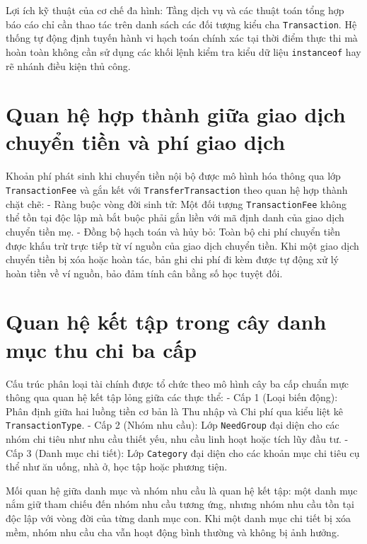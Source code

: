 \documentclass[a4paper,12pt]{report}
\newcommand{\passthrough}[1]{#1}
\begin{document}
Lợi ích kỹ thuật của cơ chế đa hình: Tầng dịch vụ và các thuật toán tổng
hợp báo cáo chỉ cần thao tác trên danh sách các đối tượng kiểu cha
\passthrough{\lstinline!Transaction!}. Hệ thống tự động định tuyến hành
vi hạch toán chính xác tại thời điểm thực thi mà hoàn toàn không cần sử
dụng các khối lệnh kiểm tra kiểu dữ liệu
\passthrough{\lstinline!instanceof!} hay rẽ nhánh điều kiện thủ công.

\section{Quan hệ hợp thành giữa giao dịch chuyển tiền và phí giao
dịch}\label{quan-hux1ec7-hux1ee3p-thuxe0nh-giux1eefa-giao-dux1ecbch-chuyux1ec3n-tiux1ec1n-vuxe0-phuxed-giao-dux1ecbch}

Khoản phí phát sinh khi chuyển tiền nội bộ được mô hình hóa thông qua
lớp \passthrough{\lstinline!TransactionFee!} và gắn kết với
\passthrough{\lstinline!TransferTransaction!} theo quan hệ hợp thành
chặt chẽ: - Ràng buộc vòng đời sinh tử: Một đối tượng
\passthrough{\lstinline!TransactionFee!} không thể tồn tại độc lập mà
bắt buộc phải gắn liền với mã định danh của giao dịch chuyển tiền mẹ. -
Đồng bộ hạch toán và hủy bỏ: Toàn bộ chi phí chuyển tiền được khấu trừ
trực tiếp từ ví nguồn của giao dịch chuyển tiền. Khi một giao dịch
chuyển tiền bị xóa hoặc hoàn tác, bản ghi chi phí đi kèm được tự động xử
lý hoàn tiền về ví nguồn, bảo đảm tính cân bằng số học tuyệt đối.

\section{Quan hệ kết tập trong cây danh mục thu chi ba
cấp}\label{quan-hux1ec7-kux1ebft-tux1eadp-trong-cuxe2y-danh-mux1ee5c-thu-chi-ba-cux1ea5p}

Cấu trúc phân loại tài chính được tổ chức theo mô hình cây ba cấp chuẩn
mực thông qua quan hệ kết tập lỏng giữa các thực thể: - Cấp 1 (Loại biến
động): Phân định giữa hai luồng tiền cơ bản là Thu nhập và Chi phí qua
kiểu liệt kê \passthrough{\lstinline!TransactionType!}. - Cấp 2 (Nhóm
nhu cầu): Lớp \passthrough{\lstinline!NeedGroup!} đại diện cho các nhóm
chi tiêu như nhu cầu thiết yếu, nhu cầu linh hoạt hoặc tích lũy đầu tư.
- Cấp 3 (Danh mục chi tiết): Lớp \passthrough{\lstinline!Category!} đại
diện cho các khoản mục chi tiêu cụ thể như ăn uống, nhà ở, học tập hoặc
phương tiện.

Mối quan hệ giữa danh mục và nhóm nhu cầu là quan hệ kết tập: một danh
mục nắm giữ tham chiếu đến nhóm nhu cầu tương ứng, nhưng nhóm nhu cầu
tồn tại độc lập với vòng đời của từng danh mục con. Khi một danh mục chi
tiết bị xóa mềm, nhóm nhu cầu cha vẫn hoạt động bình thường và không bị
ảnh hưởng.
\end{document}
